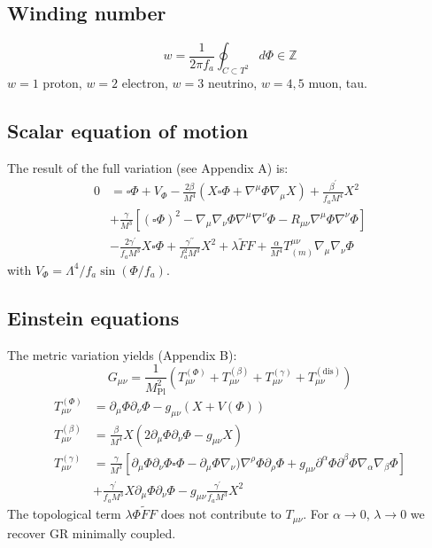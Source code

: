 \documentclass[11pt,a4paper]{article}
\begin{document}
\subsection{Winding number}
\begin{equation}
w = \frac{1}{2\pi f_{a}}\oint_{C\subset T^{2}}d\Phi \in \mathbb{Z} \tag{5}
\end{equation}
\(w = 1\) proton, \(w = 2\) electron, \(w = 3\) neutrino, \(w = 4,5\) muon, tau.

\subsection{Scalar equation of motion}
The result of the full variation (see Appendix A) is:
\begin{align}
0 &= \square \Phi +V_{\Phi} - \frac{2\beta}{M^{4}}\left(X\square \Phi +\nabla^{\mu}\Phi \nabla_{\mu}X\right) + \frac{\beta^{\prime}}{f_{a}M^{4}} X^{2} \nonumber\\
&+\frac{\gamma}{M^{3}}\left[(\square \Phi)^{2} - \nabla_{\mu}\nabla_{\nu}\Phi \nabla^{\mu}\nabla^{\nu}\Phi -R_{\mu \nu}\nabla^{\mu}\Phi \nabla^{\nu}\Phi \right] \nonumber\\
&-\frac{2\gamma^{\prime}}{f_{a}M^{3}} X\square \Phi +\frac{\gamma^{\prime\prime}}{f_{a}^{2}M^{3}} X^{2}
+\lambda \tilde{F} F + \frac{\alpha}{M^{4}} T_{(m)}^{\mu \nu}\nabla_{\mu}\nabla_{\nu}\Phi \tag{6}
\end{align}
with \(V_{\Phi} = \Lambda^{4} / f_{a}\sin (\Phi /f_{a})\).

\subsection{Einstein equations}
The metric variation yields (Appendix B):
\begin{equation}
G_{\mu \nu} = \frac{1}{M_{\mathrm{Pl}}^{2}}\left(T_{\mu \nu}^{(\Phi)} + T_{\mu \nu}^{(\beta)} + T_{\mu \nu}^{(\gamma)} + T_{\mu \nu}^{(\mathrm{dis})}\right) \tag{7}
\end{equation}
\begin{align}
T_{\mu \nu}^{(\Phi)} &= \partial_{\mu}\Phi \partial_{\nu}\Phi -g_{\mu \nu}(X + V(\Phi)) \tag{8}\\
T_{\mu \nu}^{(\beta)} &= \frac{\beta}{M^{4}} X(2\partial_{\mu}\Phi \partial_{\nu}\Phi -g_{\mu \nu}X) \tag{9}\\
T_{\mu \nu}^{(\gamma)} &= \frac{\gamma}{M^{3}}\left[\partial_{\mu}\Phi \partial_{\nu}\Phi \square \Phi -\partial_{\mu}\Phi \nabla_{\nu})\nabla^{\rho}\Phi \partial_{\rho}\Phi +g_{\mu \nu}\partial^{\alpha}\Phi \partial^{\beta}\Phi \nabla_{\alpha}\nabla_{\beta}\Phi \right] \nonumber\\
&+\frac{\gamma^{\prime}}{f_{a}M^{3}} X\partial_{\mu}\Phi \partial_{\nu}\Phi -g_{\mu \nu}\frac{\gamma^{\prime}}{f_{a}M^{3}} X^{2} \tag{10}
\end{align}
The topological term \(\lambda \Phi \tilde{F} F\) does not contribute to \(T_{\mu \nu}\). For \(\alpha \rightarrow 0\), \(\lambda \rightarrow 0\) we recover GR minimally coupled.
\end{document}
